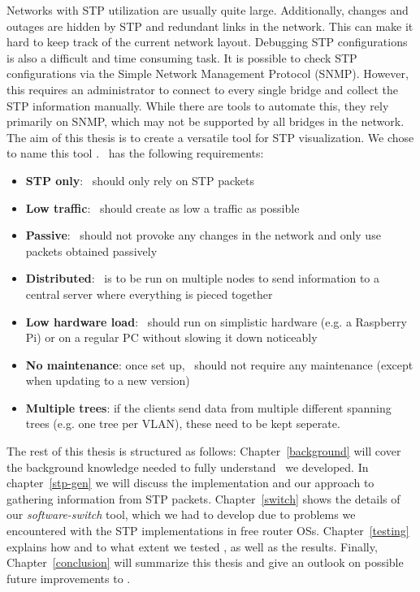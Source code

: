 Networks with STP utilization are usually quite large.
Additionally, changes and outages are hidden by STP and redundant links in the network.
This can make it hard to keep track of the current network layout.
Debugging STP configurations is also a difficult and time consuming task.
It is possible to check STP configurations via the Simple Network Management Protocol (SNMP).
However, this requires an administrator to connect to every single bridge and collect the STP information manually.
While there are tools to automate this, they rely primarily on SNMP, which may not be supported by all bridges in the network.\\

The aim of this thesis is to create a versatile tool for STP visualization.
We chose to name this tool \textit{\tool}.
\tool\ has the following requirements:
\begin{itemize}
    \item \textbf{STP only}: \tool\ should only rely on STP packets
    \item \textbf{Low traffic}: \tool\ should create as low a traffic as possible
    \item \textbf{Passive}: \tool\ should not provoke any changes in the network and only use packets obtained passively
    \item \textbf{Distributed}: \tool\ is to be run on multiple nodes to send information to a central server where everything is pieced together
    \item \textbf{Low hardware load}: \tool\ should run on simplistic hardware (e.g. a Raspberry Pi) or on a regular PC without slowing it down noticeably
    \item \textbf{No maintenance}: once set up, \tool\ should not require any maintenance (except when updating to a new version)
    \item \textbf{Multiple trees}: if the clients send data from multiple different spanning trees (e.g. one tree per VLAN), these need to be kept seperate.
    \label{requirements}
\end{itemize}

The rest of this thesis is structured as follows: %
Chapter~\ref{background} will cover the background knowledge needed to fully understand \tool\ we developed.
In chapter~\ref{stp-gen} we will discuss the implementation and our approach to gathering information from STP packets.
Chapter~\ref{switch} shows the details of our \textit{software-switch} tool, which we had to develop due to problems we encountered with the STP implementations in free router OSs\cite{OpenWrt}\cite{dd-wrt}.
Chapter~\ref{testing} explains how and to what extent we tested \tool, as well as the results.
Finally, Chapter~\ref{conclusion} will summarize this thesis and give an outlook on possible future improvements to \tool.
